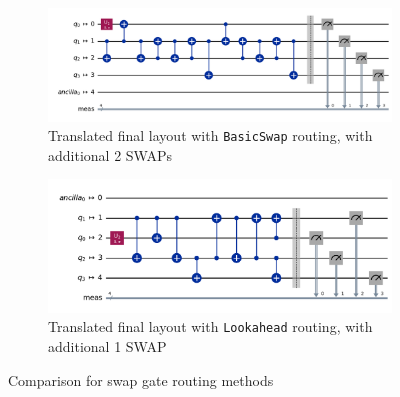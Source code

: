 \begin{figure}[htb]
    \centering
    \begin{subfigure}{0.8\linewidth}
        \includegraphics[width=\linewidth]{image/final_trivial_basic.png}
        \caption{Translated final layout with \lstinline{BasicSwap} routing, with additional 2 SWAPs}
        \label{fig:routing-basic-swap}
    \end{subfigure}
    \begin{subfigure}{0.8\linewidth}
        \includegraphics[width=\linewidth]{image/final_lookahead.png}
        \caption{Translated final layout with \lstinline{Lookahead} routing, with additional 1 SWAP}
        \label{fig:routing-lookahead}
    \end{subfigure}
    \caption{Comparison for swap gate routing methods}
\end{figure}

